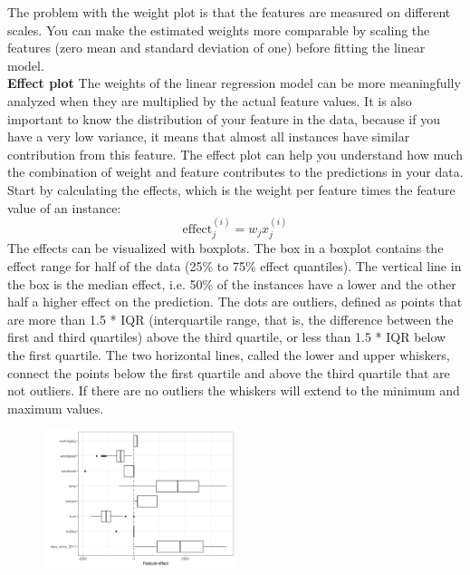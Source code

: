 The problem with the weight plot is that the features are measured on different scales.
You can make the estimated weights more comparable by scaling the features (zero mean and standard deviation of
one) before fitting the linear model.\\

\textbf{Effect plot}
The weights of the linear regression model can be more meaningfully analyzed when they are multiplied by the actual feature values.
It is also important to know the distribution of your feature in the data, because if you have a very low variance, it means that almost 
all instances have similar contribution from this feature. 
The effect plot can help you understand how much the combination of weight and feature contributes to the predictions in your data. Start by calculating the effects, 
which is the weight per feature times the feature value of an instance:
\begin{equation*}
    \text{effect}_{j}^{(i)}=w_{j}x_{j}^{(i)}
\end{equation*}
The effects can be visualized with boxplots. The box in a boxplot contains the effect range for half of the data (25\% to 75\% effect quantiles). 
The vertical line in the box is the median effect, i.e. 50\% of the instances have a lower and the other half a higher effect on the prediction. The dots are outliers, defined as points that are more than 1.5 * IQR (interquartile range, that is, the difference between the first and third quartiles) above the third quartile, or less than 1.5 * IQR below the first quartile. 
The two horizontal lines, called the lower and upper whiskers, connect the points below the first quartile and above the third quartile that are not outliers. If there are no outliers the whiskers will extend to the minimum and maximum values.
\begin{figure}[H]
    \includegraphics[width=0.5\textwidth]{img/linear-effects-1.jpeg}
    \centering
\end{figure}

